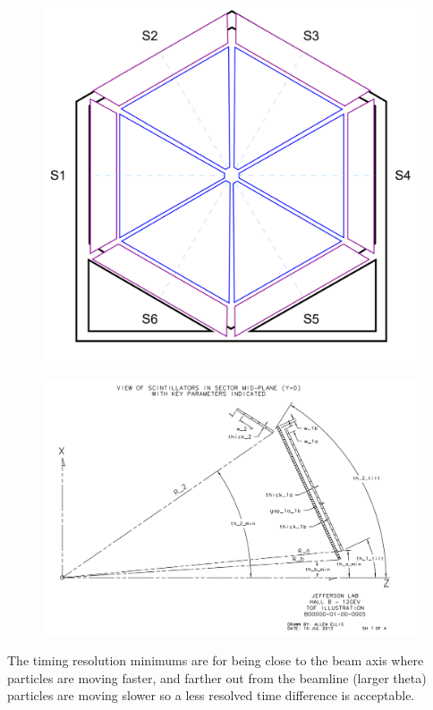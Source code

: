             									
			 \begin{figure}[H]
    			\centering
    			\includegraphics[width=12cm]{Chapters/Ch2-Experiment/clas-12-system/pics/fd/ftof-front.PNG}
			\end{figure}

		
			 \begin{figure}[H]
    			\centering
    			\includegraphics[width=12cm]{Chapters/Ch2-Experiment/clas-12-system/pics/fd/clas12-ftof-geom.PNG}
			\end{figure}
			
			
            
            The timing resolution minimums are for being close to the beam axis where particles are moving faster, and farther out from the beamline (larger theta) particles are moving slower so a less resolved time difference is acceptable. 
            
